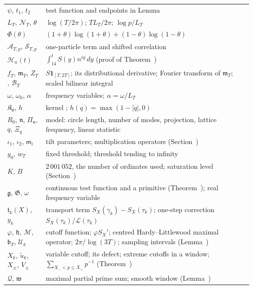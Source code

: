 \documentclass[preprint,12pt]{elsarticle}
\makeatletter
\let\CG@origref\ref
\let\CG@origeqref\eqref
\newcommand{\CG@gettip}[1]{\@ifundefined{CGTip@#1}{Reference: #1}{\csname CGTip@#1\endcsname}}
\DeclareRobustCommand{\CGref}[1]{\pdftooltip{\CG@origref{#1}}{\CG@gettip{#1}}}
\DeclareRobustCommand{\CGeqref}[1]{\pdftooltip{\CG@origeqref{#1}}{\CG@gettip{#1}}}
\numberwithin{equation}{section}
\theoremstyle{plain}
\theoremstyle{definition}
\theoremstyle{remark}
\newcommand{\lL}{\mathcal L}
\makeatother
\begin{document}
\begin{center}
\begin{longtable}{p{}p{}}
$\psi$, $t_1$, $t_2$ & test function and endpoints in Lemma~\CGref{lem:first_moment_identity}\\
$L_T$, $\mathcal N_T$, $\theta$ & $\log(T/2\pi)$; $TL_T/2\pi$; $\log p/L_T$\\
$\Phi(\theta)$ & $(1+\theta)\log(1+\theta)+(1-\theta)\log(1-\theta)$\\
$\mathcal A_{T,p}$, $\mathcal S_{T,p}$ & one-particle term and shifted correlation \CGeqref{eq:ATp_STp}\\
$\mathcal H_n(t)$ & $\int_{14}^tS(y)n^{iy}\,dy$ (proof of Theorem~\CGref{thm:projection})\\
$f_T$, $\mathfrak m_T$, $Z_T$, $\mathcal B_T$ & $S\mathbf 1_{[T,2T]}$; its distributional derivative; Fourier transform of $\mathfrak m_T$; scaled bilinear integral \CGeqref{eq:BT_scaled}\\
$\omega$, $\omega_0$, $\alpha$ & frequency variables; $\alpha=\omega/L_T$\\
$\mathfrak K_\theta$, $h$ & kernel \CGeqref{eq:kernel_piecewise}; $h(q)=\max(1-|q|,0)$\\
$R_0$, $\mathfrak n$, $\Pi_{\mathfrak n}$, $q$, $\Xi_q$ & model: circle length, number of modes, projection, lattice frequency, linear statistic\\
$\iota_1$, $\iota_2$, $\mathsf m_i$ & tilt parameters; multiplication operators (Section~\CGref{subsec:det_model})\\
$y_0$, $w_T$ & fixed threshold; threshold tending to infinity\\
$K$, $B$ & $2\,001\,052$, the number of ordinates used; saturation level (Section~\CGref{subsec:one_step_cutoff})\\
$\mathfrak g$, $\mathfrak G$, $\omega$ & continuous test function and a primitive (Theorem~\CGref{thm:identity_g}); real frequency variable\\
$\mathfrak t_k(X)$, $y_k$ & transport term $S_X(\gamma_k)-S_X(\tau_k)$; one-step correction $S_X(\tau_k)/\lL(\tau_k)$\\
$\varphi$, $\mathfrak h$, $\mathcal M$, $\mathfrak b_T$, $\mathcal U_k$ & cutoff function; $\varphi S_X'$; centred Hardy--Littlewood maximal operator; $2\pi/\log(3T)$; sampling intervals (Lemma~\CGref{lem:transport})\\
$X_k$, $\tilde u_k$, $X_\pm$, $V_\pm$ & variable cutoff; its defect; extreme cutoffs in a window; $\sum_{X_-<p\le X_+}p^{-1}$ (Theorem~\CGref{thm:variable_cutoff})\\
$\mathcal Q$, $\mathfrak w$ & maximal partial prime sum; smooth window (Lemma~\CGref{lem:maximal_primes})\\

\end{longtable}
\end{center}
\end{document}
